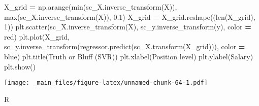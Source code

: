 \documentclass[
]{book}
\newenvironment{Shaded}{\begin{snugshade}}{\end{snugshade}}
\newcommand{\AttributeTok}[1]{\textcolor[rgb]{0.77,0.63,0.00}{#1}}
\newcommand{\BuiltInTok}[1]{#1}
\newcommand{\CommentTok}[1]{\textcolor[rgb]{0.56,0.35,0.01}{\textit{#1}}}
\newcommand{\DecValTok}[1]{\textcolor[rgb]{0.00,0.00,0.81}{#1}}
\newcommand{\FloatTok}[1]{\textcolor[rgb]{0.00,0.00,0.81}{#1}}
\newcommand{\FunctionTok}[1]{\textcolor[rgb]{0.00,0.00,0.00}{#1}}
\newcommand{\NormalTok}[1]{#1}
\newcommand{\OperatorTok}[1]{\textcolor[rgb]{0.81,0.36,0.00}{\textbf{#1}}}
\newcommand{\OtherTok}[1]{\textcolor[rgb]{0.56,0.35,0.01}{#1}}
\newcommand{\SpecialCharTok}[1]{\textcolor[rgb]{0.00,0.00,0.00}{#1}}
\newcommand{\StringTok}[1]{\textcolor[rgb]{0.31,0.60,0.02}{#1}}
\theoremstyle{definition}
\theoremstyle{definition}
\theoremstyle{definition}
\theoremstyle{definition}
\theoremstyle{remark}
\begin{document}
\begin{Shaded}
\begin{Highlighting}[]
\NormalTok{X\_grid }\OperatorTok{=}\NormalTok{ np.arange(}\BuiltInTok{min}\NormalTok{(sc\_X.inverse\_transform(X)), }\BuiltInTok{max}\NormalTok{(sc\_X.inverse\_transform(X)), }\FloatTok{0.1}\NormalTok{)}
\NormalTok{X\_grid }\OperatorTok{=}\NormalTok{ X\_grid.reshape((}\BuiltInTok{len}\NormalTok{(X\_grid), }\DecValTok{1}\NormalTok{))}
\NormalTok{plt.scatter(sc\_X.inverse\_transform(X), sc\_y.inverse\_transform(y), color }\OperatorTok{=} \StringTok{\textquotesingle{}red\textquotesingle{}}\NormalTok{)}
\NormalTok{plt.plot(X\_grid, sc\_y.inverse\_transform(regressor.predict(sc\_X.transform(X\_grid))), color }\OperatorTok{=} \StringTok{\textquotesingle{}blue\textquotesingle{}}\NormalTok{)}
\NormalTok{plt.title(}\StringTok{\textquotesingle{}Truth or Bluff (SVR)\textquotesingle{}}\NormalTok{)}
\NormalTok{plt.xlabel(}\StringTok{\textquotesingle{}Position level\textquotesingle{}}\NormalTok{)}
\NormalTok{plt.ylabel(}\StringTok{\textquotesingle{}Salary\textquotesingle{}}\NormalTok{)}
\NormalTok{plt.show()}
\end{Highlighting}
\end{Shaded}

\texttt{[image: \_main\_files/figure-latex/unnamed-chunk-64-1.pdf]}

R

\begin{Shaded}
\end{Shaded}
\end{document}
